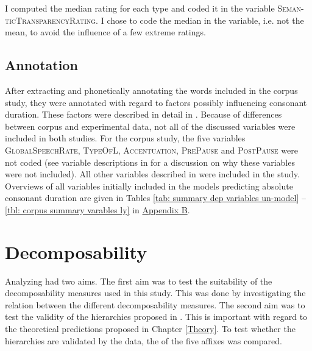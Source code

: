 I computed the median rating for each type and coded it in the variable \textsc{Seman-ticTransparencyRating}. I chose to code the median in the variable, i.e. not the mean, to avoid the influence of a few extreme ratings. 






\subsection{Annotation} \label{Overview of the Variables in the Data Set corpus}

After extracting and phonetically annotating the words included in the corpus study, they were annotated with regard to factors possibly influencing consonant duration. These factors were described in detail in . Because of differences between corpus and experimental data, not all of the discussed variables were included in both studies. For the corpus study, the five variables \textsc{GlobalSpeechRate}, \textsc{TypeOfL}, \textsc{Accentuation}, \textsc{PrePause} and \textsc{PostPause} were not coded (see variable descriptions in  for a discussion on why these variables were not included). 
All other variables described in  were included in the study. 
Overviews of all variables initially included in the models predicting absolute consonant duration are given in Tables \ref{tab: summary dep variables un-model} -- \ref{tbl: corpus summary varables ly} in \hyperref[App B: Summaries of variables in initial models of corpus study]{Appendix B}. 




\section{Decomposability} \label{corpus dec}

Analyzing  had two aims. The first aim was to test the suitability of the decomposability measures used in this study. This was done by investigating the relation between the different decomposability measures.  
The second aim was to test the validity of the  hierarchies proposed in .  This is important with regard to the theoretical predictions proposed in Chapter \ref{Theory}. To test whether the hierarchies are validated by the data, the  of the five affixes was compared.




